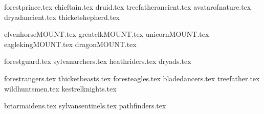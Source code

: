 

{forestprince.tex}
{chieftain.tex}
{druid.tex}
{treefatherancient.tex}
{avatarofnature.tex}
{dryadancient.tex}
{thicketshepherd.tex}

\clearpage
{}

{elvenhorseMOUNT.tex}
{greatelkMOUNT.tex}
{unicornMOUNT.tex}
{eaglekingMOUNT.tex}
{dragonMOUNT.tex}

\clearpage
{}

{forestguard.tex}
{sylvanarchers.tex}
{heathriders.tex}
{dryads.tex}

\clearpage
{}

{forestrangers.tex}
{thicketbeasts.tex}
{foresteagles.tex}
{bladedancers.tex}
{treefather.tex}
{wildhuntsmen.tex}
{kestrelknights.tex}

\clearpage
{}

{briarmaidens.tex}
{sylvansentinels.tex}
{pathfinders.tex}
